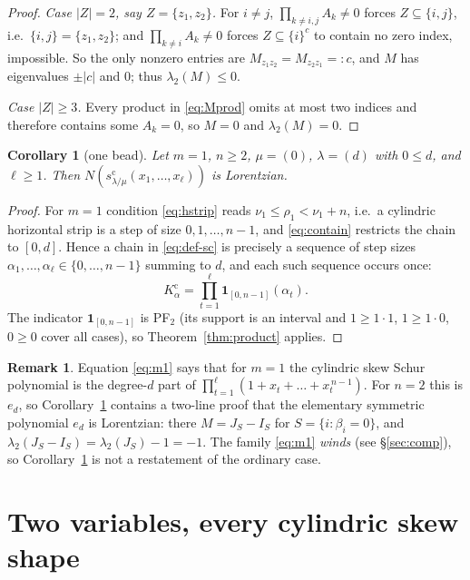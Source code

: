 \documentclass[11pt]{article}
\newtheorem{corollary}[theorem]{Corollary}
\theoremstyle{definition}
\newtheorem{remark}[theorem]{Remark}
\newcommand{\scy}{s^{\mathrm{c}}}
\newcommand{\Kc}{K^{\mathrm{c}}}
\begin{document}
\begin{proof}
\emph{Case $|Z|=2$, say $Z=\{z_1,z_2\}$.} For $i\ne j$, $\prod_{k\ne i,j}A_k\ne0$ forces
$Z\subseteq\{i,j\}$, i.e.\ $\{i,j\}=\{z_1,z_2\}$; and $\prod_{k\ne i}A_k\ne0$ forces
$Z\subseteq\{i\}^c$ to contain no zero index, impossible. So the only nonzero entries are
$M_{z_1z_2}=M_{z_2z_1}=:c$, and $M$ has eigenvalues $\pm|c|$ and $0$; thus
$\lambda_2(M)\le0$.

\emph{Case $|Z|\ge3$.} Every product in \eqref{eq:Mprod} omits at most two indices and
therefore contains some $A_k=0$, so $M=0$ and $\lambda_2(M)=0$.
\end{proof}

\begin{corollary}[one bead]\label{cor:m1}
Let $m=1$, $n\ge2$, $\mu=(0)$, $\lambda=(d)$ with $0\le d$, and $\ell\ge1$. Then
$N(\scy_{\lambda/\mu}(x_1,\dots,x_\ell))$ is Lorentzian.
\end{corollary}

\begin{proof}
For $m=1$ condition \eqref{eq:hstrip} reads $\nu_1\le\rho_1<\nu_1+n$, i.e.\ a cylindric
horizontal strip is a step of size $0,1,\dots,n-1$, and \eqref{eq:contain} restricts the chain
to $[0,d]$. Hence a chain in \eqref{eq:def-sc} is precisely a sequence of step sizes
$\alpha_1,\dots,\alpha_\ell\in\{0,\dots,n-1\}$ summing to $d$, and each such sequence occurs
once:
\begin{equation}\label{eq:m1}
  \Kc_\alpha=\prod_{t=1}^{\ell}\mathbf 1_{[0,n-1]}(\alpha_t) .
\end{equation}
The indicator $\mathbf 1_{[0,n-1]}$ is PF$_2$ (its support is an interval and
$1\ge1\cdot1$, $1\ge1\cdot0$, $0\ge0$ cover all cases), so Theorem~\ref{thm:product} applies.
\end{proof}

\begin{remark}
Equation \eqref{eq:m1} says that for $m=1$ the cylindric skew Schur polynomial is the degree-$d$
part of $\prod_{t=1}^{\ell}(1+x_t+\dots+x_t^{\,n-1})$. For $n=2$ this is $e_d$, so
Corollary~\ref{cor:m1} contains a two-line proof that the elementary symmetric polynomial $e_d$
is Lorentzian: there $M=J_S-I_S$ for $S=\{i:\beta_i=0\}$, and
$\lambda_2(J_S-I_S)=\lambda_2(J_S)-1=-1$. The family \eqref{eq:m1} \emph{winds} (see
\S\ref{sec:comp}), so Corollary~\ref{cor:m1} is not a restatement of the ordinary case.
\end{remark}

\section{Two variables, every cylindric skew shape}
\end{document}
